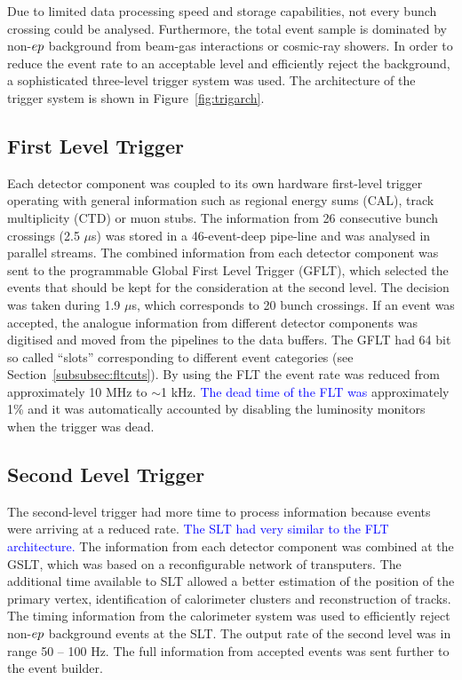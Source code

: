 Due to limited data processing speed and storage capabilities, not every bunch crossing could be analysed. Furthermore, the total event sample is dominated by non-$\mbox{$e p$}$ background from beam-gas interactions or cosmic-ray showers. In order to reduce the event rate to an acceptable level and efficiently reject the background, a sophisticated three-level trigger system was used. The architecture of the \zeus trigger system is shown in Figure~\ref{fig:trigarch}. 

\subsection{First Level Trigger}
\label{subsec:flt} Each detector component was coupled to its own hardware first-level trigger operating with general information such as regional energy sums (CAL), track multiplicity (CTD) or muon stubs. The information from 26 consecutive bunch crossings (2.5 $\mu$s) was stored in a 46-event-deep pipe-line and was analysed in parallel streams. The combined information from each detector component was sent to the programmable Global First Level Trigger (GFLT), which selected the events that should be kept for the consideration at the second level. The decision was taken during 1.9 $\mu$s, which corresponds to 20 bunch crossings. If an event was accepted, the analogue information from different detector components was digitised and moved from the pipelines to the data buffers. The GFLT had 64 bit so called ``slots'' corresponding to different event categories (see Section~\ref{subsubsec:fltcuts}). By using the FLT the event rate was reduced from approximately 10 MHz to $\sim$1 kHz. \textcolor{blue}{The dead time of the FLT was} approximately 1\% and it was automatically accounted by disabling the luminosity monitors when the trigger was dead.

\subsection{Second Level Trigger}
\label{subsec:slt}
The second-level trigger had more time to process information because events were arriving at a reduced rate. \textcolor{blue}{The SLT had very similar to the FLT architecture.} The information from each detector component was combined at the GSLT, which was based on a reconfigurable network of transputers. The additional time available to SLT allowed a better estimation of the position of the primary vertex, identification of  calorimeter clusters and reconstruction of tracks. The timing information from the calorimeter system was used to efficiently reject non-$\mbox{$e p$}$ background events at the SLT. The output rate of the second level was in range 50 -- 100 Hz. The full information from accepted events was sent further to the event builder.

